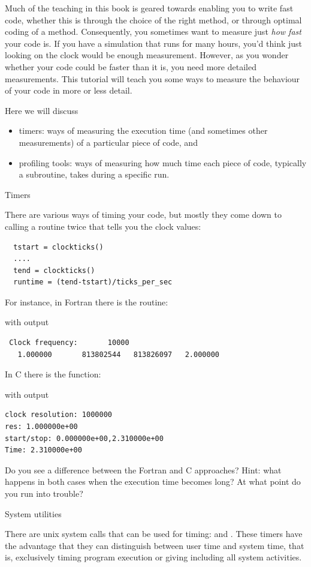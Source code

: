 Much of the teaching in this book is geared towards enabling you to
write fast code, whether this is through the choice of the right
method, or through optimal coding of a method. Consequently, you
sometimes want to measure just \emph{how fast} your code is. If you
have a simulation that runs for many hours, you'd think just looking
on the clock would be enough measurement. However, as you wonder
whether your code could be faster than it is, you need more detailed
measurements. This tutorial will teach you some ways to measure the
behaviour of your code in more or less detail.

Here we will discuss 
\begin{itemize}
\item timers: ways of measuring the execution time (and sometimes
  other measurements) of a particular piece of code, and
\item profiling tools: ways of measuring how much time each piece of
  code, typically a subroutine, takes during a specific run.
\end{itemize}

 {Timers}

There are various ways of timing your code, but mostly they come down
to calling a routine twice that tells you the clock values:
\begin{verbatim}
  tstart = clockticks()
  ....
  tend = clockticks()
  runtime = (tend-tstart)/ticks_per_sec
\end{verbatim}
For instance, in Fortran there is the 
routine:

with output
\begin{verbatim}
 Clock frequency:       10000
   1.000000       813802544   813826097   2.000000  
\end{verbatim}
In C there is the  function:

with output
\begin{verbatim}
clock resolution: 1000000
res: 1.000000e+00
start/stop: 0.000000e+00,2.310000e+00
Time: 2.310000e+00
\end{verbatim}
Do you see a difference between the Fortran and C approaches? Hint:
what happens in both cases when the execution time becomes long? At
what point do you run into trouble?

 {System utilities}

There are unix system calls that can be used for timing: 
and . These timers have the advantage that they can
distinguish between user time and system time, that is, exclusively
timing program execution or giving 
including all system activities.


